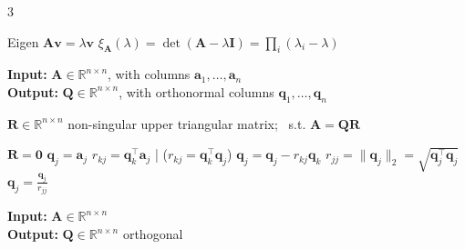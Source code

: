 \documentclass{note}
\begin{document}
\begin{multicols}{3}
{\vspace{-5pt}
\begin{MyTh}{Eigen}
    $\mathbf{A}\mathbf{v}=\lambda\mathbf{v}$ \quad $\xi_{\mathbf{A}}(\lambda)=\det(\mathbf{A}-\lambda \mathbf{I})=\prod_{i}(\lambda_i-\lambda)$ \quad
\end{MyTh}
}

\newcolumn

\begin{algorithm}[H]
\tiny
\caption*{\textbf{(M)GS} (Modified) Gram-Schmidt \quad \ps{$C(n)=2n^3+n^2+n$}}
\textbf{Input:} $\mathbf{A} \in \mathbb{R}^{n \times n}$, with columns $\mathbf{a}_1, \dots, \mathbf{a}_n$ \\
\textbf{Output:} $\mathbf{Q} \in \mathbb{R}^{n \times n}$, with orthonormal columns $\mathbf{q}_1, \dots, \mathbf{q}_n$

\qquad\qquad $\mathbf{R} \in \mathbb{R}^{n \times n}$ non-singular upper triangular matrix; \ s.t. $\mathbf{A} = \mathbf{Q}\mathbf{R}$
\begin{algorithmic}[1]
  \State $\mathbf{R} = \mathbf{0}$
    \State $\mathbf{q}_j = \mathbf{a}_j$
      \State $r_{kj} = \mathbf{q}_k^\top \mathbf{a}_j$ \quad | \quad ($r_{kj} = \mathbf{q}_k^\top \mathbf{q}_j$)
      \State $\mathbf{q}_j = \mathbf{q}_j - r_{kj} \mathbf{q}_k$ 
    \EndFor
    \State $r_{jj} = \|\mathbf{q}_j\|_2=\sqrt{\mathbf{q}_j^\top \mathbf{q}_j}$
    \State $\mathbf{q}_j = \frac{\mathbf{q}_j}{r_{jj}}$
  \EndFor
\end{algorithmic}
\end{algorithm}

\begin{algorithm}[H]
\tiny
\caption*{\textbf{QR} Householder QR factorization \quad \ps{$C(n)=\frac{8}{3}n^3+\Ocal(n^2)$}}
\textbf{Input:} $\mathbf{A} \in \mathbb{R}^{n \times n}$ \\
\textbf{Output:} $\mathbf{Q} \in \mathbb{R}^{n \times n}$ orthogonal


\end{algorithm}
\end{multicols}
\end{document}

